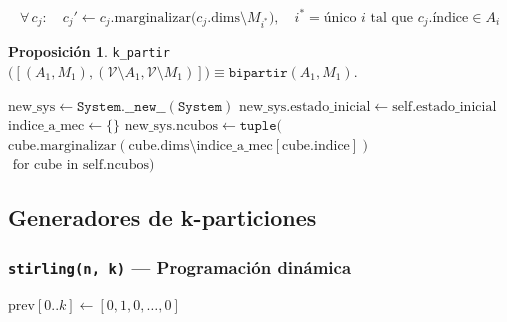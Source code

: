 \documentclass[12pt,letterpaper]{article}
\theoremstyle{definition}
\newtheorem{proposition}{Proposición}[section]
\theoremstyle{remark}
\newcommand{\V}{\mathcal{V}}
\newcommand{\Stir}[2]{S(#1,#2)}
\newcommand{\N}{\mathbb{N}}
\begin{document}
\begin{equation}
  \forall\, c_j: \quad c_j' \leftarrow c_j.\mathrm{marginalizar}
  \bigl(c_j.\mathrm{dims} \setminus M_{i^*}\bigr), \quad
  i^* = \text{único } i \text{ tal que } c_j.\mathrm{índice} \in A_i
  \label{eq:k_partir}
\end{equation}

\begin{proposition}
\texttt{k\_partir}$\bigl([(A_1, M_1), (\V \setminus A_1, \V \setminus M_1)]\bigr)
\equiv \texttt{bipartir}(A_1, M_1)$.
\end{proposition}

\begin{algorithm}[H]
\SetAlgoLined
{}
$\mathrm{new\_sys} \leftarrow \texttt{System.\_\_new\_\_}(\texttt{System})$\;
$\mathrm{new\_sys.estado\_inicial} \leftarrow \mathrm{self.estado\_inicial}$\;
$\mathrm{indice\_a\_mec} \leftarrow \{\}$\;
$\mathrm{new\_sys.ncubos} \leftarrow \texttt{tuple}($
  $\mathrm{cube.marginalizar}(\mathrm{cube.dims} \setminus
    \mathrm{indice\_a\_mec}[\mathrm{cube.indice}])$
  $\text{ for cube in self.ncubos})$\;
\;
\caption{\texttt{System.k\_partir(particion)}}
\label{alg:k_partir}
\end{algorithm}

\subsection{Generadores de k-particiones}

\subsubsection{\texttt{stirling(n, k)} --- Programación dinámica}

\begin{algorithm}[H]
\SetAlgoLined
{}
\KwOut{$\Stir{n}{k} \in \N_0$}
$\mathrm{prev}[0..k] \leftarrow [0, 1, 0, \ldots, 0]$\;
\;
\caption{\texttt{stirling(n, k)} --- O(n·k) tiempo, O(k) espacio}
\label{alg:stirling}
\end{algorithm}
\end{document}
